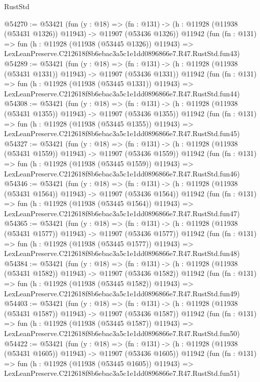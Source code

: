 \begin{lexlean}{RustStd}
\begin{coremodule}
@54270 := @53421
    (fun (y : @18) =>
    (fn : @131) -> (h : @11928 (@11938 (@53431 @1326)) @11943) -> @11907 (@53436 @1326))
    @11942
    (fun (fn : @131) =>
    fun (h : @11928 (@11938 (@53445 @1326)) @11943) =>
    LexLeanPreserve.C212618f8b6ebac3a5c1e1dd0896866e7.R47.RustStd.fun43)
@54289 := @53421
    (fun (y : @18) =>
    (fn : @131) -> (h : @11928 (@11938 (@53431 @1331)) @11943) -> @11907 (@53436 @1331))
    @11942
    (fun (fn : @131) =>
    fun (h : @11928 (@11938 (@53445 @1331)) @11943) =>
    LexLeanPreserve.C212618f8b6ebac3a5c1e1dd0896866e7.R47.RustStd.fun44)
@54308 := @53421
    (fun (y : @18) =>
    (fn : @131) -> (h : @11928 (@11938 (@53431 @1355)) @11943) -> @11907 (@53436 @1355))
    @11942
    (fun (fn : @131) =>
    fun (h : @11928 (@11938 (@53445 @1355)) @11943) =>
    LexLeanPreserve.C212618f8b6ebac3a5c1e1dd0896866e7.R47.RustStd.fun45)
@54327 := @53421
    (fun (y : @18) =>
    (fn : @131) -> (h : @11928 (@11938 (@53431 @1559)) @11943) -> @11907 (@53436 @1559))
    @11942
    (fun (fn : @131) =>
    fun (h : @11928 (@11938 (@53445 @1559)) @11943) =>
    LexLeanPreserve.C212618f8b6ebac3a5c1e1dd0896866e7.R47.RustStd.fun46)
@54346 := @53421
    (fun (y : @18) =>
    (fn : @131) -> (h : @11928 (@11938 (@53431 @1564)) @11943) -> @11907 (@53436 @1564))
    @11942
    (fun (fn : @131) =>
    fun (h : @11928 (@11938 (@53445 @1564)) @11943) =>
    LexLeanPreserve.C212618f8b6ebac3a5c1e1dd0896866e7.R47.RustStd.fun47)
@54365 := @53421
    (fun (y : @18) =>
    (fn : @131) -> (h : @11928 (@11938 (@53431 @1577)) @11943) -> @11907 (@53436 @1577))
    @11942
    (fun (fn : @131) =>
    fun (h : @11928 (@11938 (@53445 @1577)) @11943) =>
    LexLeanPreserve.C212618f8b6ebac3a5c1e1dd0896866e7.R47.RustStd.fun48)
@54384 := @53421
    (fun (y : @18) =>
    (fn : @131) -> (h : @11928 (@11938 (@53431 @1582)) @11943) -> @11907 (@53436 @1582))
    @11942
    (fun (fn : @131) =>
    fun (h : @11928 (@11938 (@53445 @1582)) @11943) =>
    LexLeanPreserve.C212618f8b6ebac3a5c1e1dd0896866e7.R47.RustStd.fun49)
@54403 := @53421
    (fun (y : @18) =>
    (fn : @131) -> (h : @11928 (@11938 (@53431 @1587)) @11943) -> @11907 (@53436 @1587))
    @11942
    (fun (fn : @131) =>
    fun (h : @11928 (@11938 (@53445 @1587)) @11943) =>
    LexLeanPreserve.C212618f8b6ebac3a5c1e1dd0896866e7.R47.RustStd.fun50)
@54422 := @53421
    (fun (y : @18) =>
    (fn : @131) -> (h : @11928 (@11938 (@53431 @1605)) @11943) -> @11907 (@53436 @1605))
    @11942
    (fun (fn : @131) =>
    fun (h : @11928 (@11938 (@53445 @1605)) @11943) =>
    LexLeanPreserve.C212618f8b6ebac3a5c1e1dd0896866e7.R47.RustStd.fun51)

\end{coremodule}
\end{lexlean}
